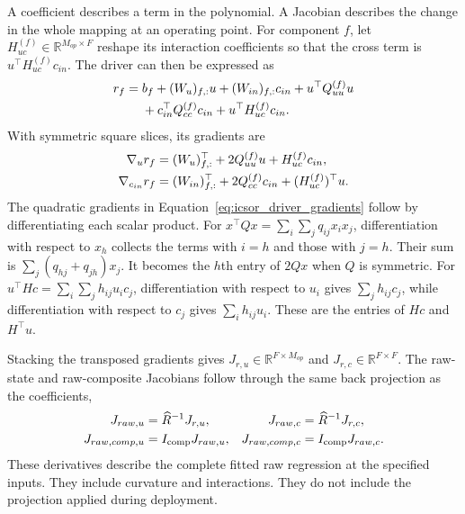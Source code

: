 A coefficient describes a term in the polynomial. A Jacobian describes the change in the whole mapping at an operating point. For component \(f\), let \(H_{uc}^{(f)}\in\mathbb{R}^{M_{op}\times F}\) reshape its interaction coefficients so that the cross term is \(u^\top H_{uc}^{(f)}c_{in}\). The driver can then be expressed as
\begin{equation}
\equationname{Component driver expressed through symmetric quadratic matrices}
\label{eq:icsor_driver_component}
\begin{aligned}
r_f={}&b_f+(W_u)_{f,:}u+(W_{in})_{f,:}c_{in}
+u^\top Q_{uu}^{(f)}u\\
&+c_{in}^\top Q_{cc}^{(f)}c_{in}
+u^\top H_{uc}^{(f)}c_{in}.
\end{aligned}
\end{equation}
With symmetric square slices, its gradients are
\begin{equation}
\equationname{Operating and influent gradients of a component driver}
\label{eq:icsor_driver_gradients}
\begin{aligned}
\nabla_u r_f&=(W_u)_{f,:}^\top+2Q_{uu}^{(f)}u
+H_{uc}^{(f)}c_{in},\\
\nabla_{c_{in}}r_f&=(W_{in})_{f,:}^\top+2Q_{cc}^{(f)}c_{in}
+(H_{uc}^{(f)})^\top u.
\end{aligned}
\end{equation}
The quadratic gradients in Equation~\eqref{eq:icsor_driver_gradients} follow by differentiating each scalar product. For \(x^\top Qx=\sum_i\sum_jq_{ij}x_ix_j\), differentiation with respect to \(x_h\) collects the terms with \(i=h\) and those with \(j=h\). Their sum is \(\sum_j(q_{hj}+q_{jh})x_j\). It becomes the \(h\)th entry of \(2Qx\) when \(Q\) is symmetric. For \(u^\top Hc=\sum_i\sum_jh_{ij}u_ic_j\), differentiation with respect to \(u_i\) gives \(\sum_jh_{ij}c_j\), while differentiation with respect to \(c_j\) gives \(\sum_i h_{ij}u_i\). These are the entries of \(Hc\) and \(H^\top u\).

Stacking the transposed gradients gives \(J_{r,u}\in\mathbb{R}^{F\times M_{op}}\) and \(J_{r,c}\in\mathbb{R}^{F\times F}\). The raw-state and raw-composite Jacobians follow through the same back projection as the coefficients,
\begin{equation}
\equationname{Raw component and composite Jacobians after coupling}
\label{eq:icsor_raw_jacobians}
\begin{aligned}
J_{raw,u}&=\widehat R^{-1}J_{r,u},
&J_{raw,c}&=\widehat R^{-1}J_{r,c},\\
J_{raw,comp,u}&=I_{\mathrm{comp}}J_{raw,u},
&J_{raw,comp,c}&=I_{\mathrm{comp}}J_{raw,c}.
\end{aligned}
\end{equation}
These derivatives describe the complete fitted raw regression at the specified inputs. They include curvature and interactions. They do not include the projection applied during deployment.

